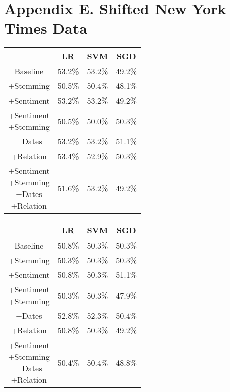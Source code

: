 \documentclass[11pt,a4paper]{article}
\begin{document}
\section{Appendix E. Shifted New York Times Data}
\begin{center}
\begin{tabular}{ |c|c|c|c| }
 \hline
  & LR & SVM & SGD \\
  \hline
  Baseline & 53.2\% & 53.2\% & 49.2\% \\
  \hline
 +Stemming & 50.5\% & 50.4\% & 48.1\% \\
  \hline
 +Sentiment & 53.2\% & 53.2\% & 49.2\% \\
  \hline
  \shortstack{+Sentiment \\ +Stemming} & 50.5\% & 50.0\% & 50.3\%\\
 \hline
 +Dates & 53.2\% & 53.2\% & 51.1\% \\
  \hline
 +Relation & 53.4\% & 52.9\% & 50.3\% \\
  \hline
  \shortstack{+Sentiment \\ +Stemming \\+Dates \\+Relation} & 51.6\% & 53.2\% & 49.2\% \\
 \hline
\end{tabular}
\end{center}

\begin{center}
\begin{tabular}{ |c|c|c|c| }
 \hline
  & LR & SVM & SGD \\
  \hline
  Baseline & 50.8\% & 50.3\% & 50.3\% \\
  \hline
 +Stemming & 50.3\% & 50.3\% & 50.3\% \\
  \hline
 +Sentiment & 50.8\% & 50.3\% & 51.1\% \\
  \hline
  \shortstack{+Sentiment \\ +Stemming} & 50.3\% & 50.3\% & 47.9\%\\
 \hline
 +Dates & 52.8\% & 52.3\% & 50.4\% \\
  \hline
 +Relation & 50.8\% & 50.3\% & 49.2\% \\
  \hline
  \shortstack{+Sentiment \\ +Stemming \\+Dates \\+Relation} & 50.4\% & 50.4\% & 48.8\% \\
 \hline
\end{tabular}
\end{center}
\end{document}
